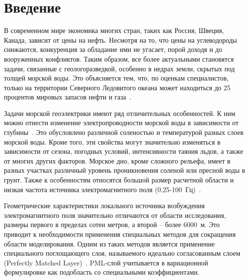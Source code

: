 \documentclass[a4paper,14pt]{article}
\begin{document}

\tableofcontents


\clearpage
{}
\section*{Введение}


В современном мире экономика многих стран, таких как Россия, Швеция, Канада, зависит от цены на нефть. Несмотря на то, что цены на углеводороды снижаются, конкуренция за обладание ими не угасает, порой доходя и до вооруженных конфликтов. Таким образом, все более актуальными становятся задачи, связанные с геологоразведкой, особенно в недрах земли, скрытых под толщей морской воды. Это объясняется тем, что, по оценкам специалистов, только на территории Северного Ледовитого океана может находиться до 25 процентов мировых запасов нефти и газа~\citep{shurina}.

Задачи морской геоэлектрики имеют ряд отличительных особенностей. К ним можно отнести изменение электропроводности морской воды в зависимости от глубины~\citep{shurina}. Это обусловлено различной соленостью и температурой разных слоев морской воды. Кроме того, эти свойства могут значительно изменяться в зависимости от сезона, погодных условий, интенсивности таяния льдов, а также от многих других факторов. Морское дно, кроме сложного рельефа, имеет в разных участках различный уровень проникновения соленой или пресной воды в грунт. Также к особенностям относятся большой размер расчетной области и низкая частота источника электромагнитного поля (0.25-100~Гц)~\citep{gabrielsen}.

Геометрические характеристики локального источника возбуждения электромагнитного поля значительно отличаются от области исследования, размеры первого в пределах сотен метров, а второй -- более 6000~м. Это приводит к необходимости применения специальных методов для сокращения области моделирования. Одним из таких методов является применение специального поглощающего слоя, называемого идеально согласованным слоем (Perfectly Matched Layer)~\citep{berenger, wiik_dehoop_ursin}. PML-слой учитывается в вариационной формулировке как подобласть со специальными коэффициентами. 
\end{document}
